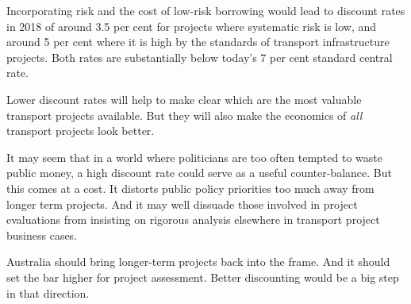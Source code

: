 \documentclass{grattan}
\begin{document}
\begin{overview}
Incorporating risk and the cost of low-risk borrowing would lead to discount rates in 2018 of around 3.5 per cent for projects where systematic risk is low, and around 5 per cent where it is high by the standards of transport infrastructure projects. Both rates are substantially below today’s 7 per cent standard central rate.
 
Lower discount rates will help to make clear which are the most valuable transport projects available. But they will also make the economics of \textit{all} transport projects look better. 

It may seem that in a world where politicians are too often tempted to waste public money, a high discount rate could serve as a useful counter-balance. But this comes at a cost. It distorts public policy priorities too much away from longer term projects. And it may well dissuade those involved in project evaluations from insisting on rigorous analysis elsewhere in transport project business cases.  

Australia should bring longer-term projects back into the frame. And it should set the bar higher for project assessment. Better discounting would be a big step in that direction.

\end{overview}
 
\end{document}
